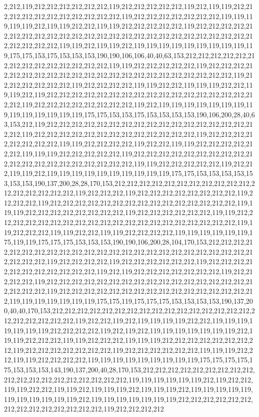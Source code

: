 2,212,119,212,212,212,212,212,212,119,212,212,212,212,212,119,212,119,119,212,212,212,212,212,212,212,212,212,212,212,119,212,212,212,212,212,212,212,119,119,119,119,119,212,119,119,212,212,119,119,212,212,212,212,212,119,212,212,212,212,212,212,212,212,212,212,212,212,212,212,212,212,212,212,212,212,212,212,212,212,212,212,212,212,212,119,119,212,119,119,212,119,119,119,119,119,119,119,119,119,119,175,175,153,175,153,153,153,190,190,106,106,40,40,63,153,212,212,212,212,212,212,212,212,212,212,212,212,212,212,119,119,212,212,212,212,212,119,212,212,212,212,212,212,212,212,212,212,212,212,212,212,212,212,212,212,212,212,212,212,119,212,212,212,212,212,212,119,212,212,212,212,119,119,212,212,119,119,119,212,212,119,119,212,119,212,212,212,212,212,212,212,212,212,212,212,212,212,212,212,212,212,212,119,212,212,212,212,212,212,212,212,119,212,119,119,119,119,119,119,119,119,119,119,119,119,119,119,175,175,153,153,175,153,153,153,153,190,106,200,28,40,63,153,212,119,212,212,212,212,212,212,212,212,212,212,212,212,212,212,212,212,212,212,119,212,212,212,212,212,212,212,212,212,212,212,212,212,119,212,212,212,212,212,212,212,212,119,119,212,212,212,212,119,212,212,119,119,212,212,212,212,212,212,119,119,119,212,212,212,212,212,119,212,212,212,212,212,212,212,212,212,212,212,212,212,212,212,212,212,212,212,212,119,119,212,212,212,212,212,119,212,212,119,119,212,119,119,119,119,119,119,119,119,119,119,175,175,153,153,153,153,153,153,153,190,137,200,28,28,170,153,212,212,212,212,212,212,212,212,212,212,212,212,212,212,212,212,212,119,212,212,212,119,212,212,212,212,212,212,212,212,119,212,212,212,119,212,212,212,212,212,212,212,212,212,212,212,212,212,212,212,119,119,119,212,212,212,212,212,212,212,212,119,212,212,212,212,212,212,119,119,212,212,212,212,212,212,212,212,212,212,212,212,212,212,212,212,212,212,212,212,119,119,212,212,212,119,119,212,212,119,119,212,212,212,212,119,119,119,119,119,119,175,119,119,175,175,175,153,153,153,190,190,106,200,28,104,170,153,212,212,212,212,212,212,212,212,212,212,212,212,212,212,212,212,212,212,212,212,212,212,212,212,212,212,212,119,212,212,212,212,119,212,212,212,212,212,212,119,212,212,212,212,212,212,212,212,212,212,212,119,212,119,212,212,212,212,212,212,212,119,212,212,212,212,119,212,212,212,212,212,212,212,212,212,212,212,212,212,212,212,212,212,212,212,212,119,212,212,212,212,212,212,212,212,212,212,212,212,212,212,212,212,119,119,119,119,119,119,119,175,175,119,175,175,175,153,153,153,153,190,137,200,40,40,170,153,212,212,212,212,212,212,212,212,212,212,212,212,212,212,212,212,212,212,212,212,212,212,119,212,212,119,212,119,119,119,119,212,212,119,119,119,119,119,119,119,212,212,212,212,119,212,119,212,119,119,119,119,119,119,119,212,119,119,212,212,212,119,119,212,212,212,119,119,119,212,212,212,212,212,212,212,212,119,212,212,212,212,212,212,212,119,212,212,212,212,212,212,119,119,119,212,212,119,119,212,212,212,212,119,119,119,119,119,119,119,119,119,175,175,175,175,175,153,153,153,143,190,137,200,40,28,170,153,212,212,212,212,212,212,212,212,212,212,212,212,212,212,212,212,212,212,212,119,119,119,119,119,119,212,119,212,212,119,119,212,212,119,119,212,119,119,119,212,119,119,119,212,119,119,119,119,119,119,119,119,119,119,119,212,119,119,119,119,119,119,119,212,212,212,212,212,212,212,212,212,212,212,212,212,212,119,212,212,212,212